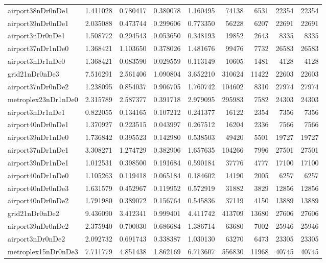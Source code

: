 \begin{longtable}{|l|r|r|r|r|r|r|r|r|}
airport38nDr0nDe1 & 1.411028 & 0.780417 & 0.380078 & 1.160495 & 74138 & 6531 & 22354 & 22354 \\
airport39nDr0nDe1 & 2.035088 & 0.473744 & 0.299606 & 0.773350 & 56228 & 6207 & 22691 & 22691 \\
airport3nDr0nDe1 & 1.508772 & 0.294543 & 0.053650 & 0.348193 & 19852 & 2643 & 8335 & 8335 \\
airport37nDr1nDe0 & 1.368421 & 1.103650 & 0.378026 & 1.481676 & 99476 & 7732 & 26583 & 26583 \\
airport3nDr1nDe0 & 1.368421 & 0.083590 & 0.029559 & 0.113149 & 10605 & 1481 & 4128 & 4128 \\
grid21nDr0nDe3 & 7.516291 & 2.561406 & 1.090804 & 3.652210 & 310624 & 11422 & 22603 & 22603 \\
airport37nDr0nDe2 & 1.238095 & 0.854037 & 0.906705 & 1.760742 & 104602 & 8310 & 27974 & 27974 \\
metroplex23nDr1nDe0 & 2.315789 & 2.587377 & 0.391718 & 2.979095 & 295983 & 7582 & 24303 & 24303 \\
airport3nDr1nDe1 & 0.822055 & 0.134165 & 0.107212 & 0.241377 & 16122 & 2354 & 7356 & 7356 \\
airport40nDr0nDe1 & 1.370927 & 0.223515 & 0.043997 & 0.267512 & 16204 & 2336 & 7566 & 7566 \\
airport39nDr1nDe0 & 1.736842 & 0.395523 & 0.142980 & 0.538503 & 49420 & 5501 & 19727 & 19727 \\
airport37nDr1nDe1 & 3.308271 & 1.274729 & 0.382906 & 1.657635 & 104266 & 7996 & 27501 & 27501 \\
airport39nDr1nDe1 & 1.012531 & 0.398500 & 0.191684 & 0.590184 & 37776 & 4777 & 17100 & 17100 \\
airport40nDr1nDe0 & 1.105263 & 0.119418 & 0.065184 & 0.184602 & 14190 & 2005 & 6257 & 6257 \\
airport40nDr0nDe3 & 1.631579 & 0.452967 & 0.119952 & 0.572919 & 31882 & 3829 & 12856 & 12856 \\
airport40nDr0nDe2 & 1.791980 & 0.389072 & 0.156764 & 0.545836 & 37119 & 4150 & 13889 & 13889 \\
grid21nDr0nDe2 & 9.436090 & 3.412341 & 0.999401 & 4.411742 & 413709 & 13680 & 27606 & 27606 \\
airport39nDr0nDe2 & 2.375940 & 0.700030 & 0.686684 & 1.386714 & 63680 & 7002 & 25946 & 25946 \\
airport3nDr0nDe2 & 2.092732 & 0.691743 & 0.338387 & 1.030130 & 63270 & 6473 & 23305 & 23305 \\
metroplex15nDr0nDe3 & 7.711779 & 4.851438 & 1.862169 & 6.713607 & 556830 & 11968 & 40745 & 40745 \\

\end{longtable}
